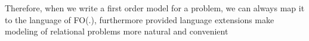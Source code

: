Therefore, when we write a first order model for a problem, we can always map it to the language of FO(.), furthermore provided language extensions make modeling of relational problems more natural and convenient





